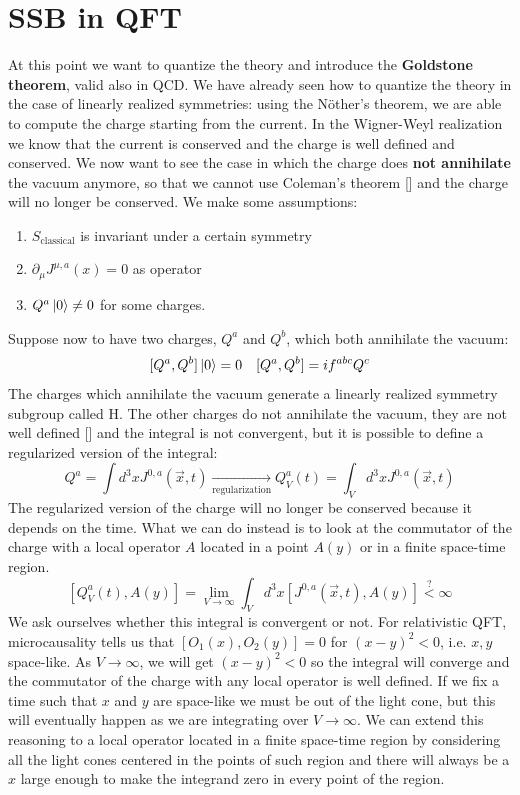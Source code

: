 \documentclass[../main.tex]{subfiles}
\begin{document}
\section{SSB in QFT}
At this point we want to quantize the theory and introduce the \textbf{Goldstone theorem}, valid also in QCD. We have already seen how to quantize the theory in the case of linearly realized symmetries: using the N\"other's theorem, we are able to compute the charge starting from the current. In the Wigner-Weyl realization we know that the current is conserved and the charge is well defined and conserved. We now want to see the case in which the charge does \textbf{not annihilate} the vacuum anymore, so that we cannot use Coleman's theorem [] and the charge will no longer be conserved. We make some assumptions:
\begin{enumerate}
    \item $S_{\text{classical}}$ is invariant under a certain symmetry
    \item $\partial_\mu J^{\mu,a}(x)=0$ as operator
    \item $Q^a\ket{0}\neq0$ for some charges.
\end{enumerate}
Suppose now to have two charges, $Q^a$ and $Q^b$, which both annihilate the vacuum:
\[
[Q^a,Q^b]\ket{0}=0 \quad [Q^a,Q^b]=if^{abc}Q^c
\]
The charges which annihilate the vacuum generate a linearly realized symmetry subgroup called H. The other charges do not annihilate the vacuum, they are not well defined [] and the integral is not convergent, but it is possible to define a regularized version of the integral:
\[
Q^a=\int d^3xJ^{0,a}(\Vec{x},t)\xrightarrow[\text{regularization}]{}Q^a_V(t)=\int_V d^3xJ^{0,a}(\Vec{x},t)
\]
The regularized version of the charge will no longer be conserved because it depends on the time. What we can do instead is to look at the commutator of the charge with a local operator $A$ located in a point $A(y)$ or in a finite space-time region.
\[
[Q_V^a(t),A(y)]=\lim_{V\to\infty}\int_Vd^3x[J^{0,a}(\Vec{x},t),A(y)]\stackrel{?}{<}\infty
\]
We ask ourselves whether this integral is convergent or not. For relativistic QFT, microcausality tells us that $[O_1(x),O_2(y)]=0$ for $(x-y)^2<0$, i.e. $x,y$ space-like. As $V\to\infty$, we will get $(x-y)^2<0$ so the integral will converge and the commutator of the charge with any local operator is well defined. If we fix a time such that $x$ and $y$ are space-like we must be out of the light cone, but this will eventually happen as we are integrating over $V\to\infty$. We can extend this reasoning to a local operator located in a finite space-time region by considering all the light cones centered in the points of such region and there will always be a $x$ large enough to make the integrand zero in every point of the region.\\
\end{document}

